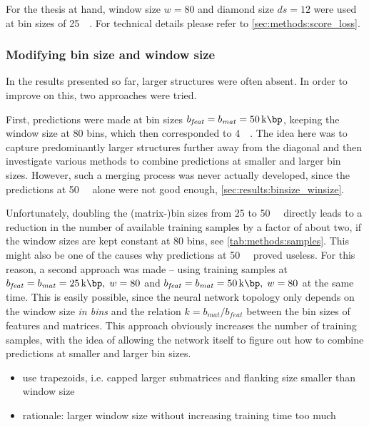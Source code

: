 For the thesis at hand, window size $w=80$ and diamond size $ds={12}$ were used at bin sizes of \SI{25}{\kilo\bp}.
For technical details please refer to \cref{sec:methods:score_loss}.

\subsubsection{Modifying bin size and window size}\label{sec:improve:binsize_winsize}
In the results presented so far, larger structures were often absent.
In order to improve on this, two approaches were tried.

First, predictions were made at bin sizes $b_\mathit{feat} = b_\mathit{mat} = \SI{50}{\kilo\bp}$, 
keeping the window size at 80 bins, which then corresponded to \SI{4}{\mega\bp}.
The idea here was to capture predominantly larger structures further away from the diagonal and
then investigate various methods to combine predictions at smaller and larger bin sizes.
However, such a merging process was never actually developed,
since the predictions at \SI{50}{\kilo\bp} alone were not good enough, \cref{sec:results:binsize_winsize}.

Unfortunately, doubling the (matrix-)bin sizes from 25 to \SI{50}{\kilo\bp} directly leads to a reduction in the number of available training samples by a factor of about two, 
if the window sizes are kept constant at 80 bins, see \cref{tab:methods:samples}. 
This might also be one of the causes why predictions at \SI{50}{\kilo\bp} proved useless.
For this reason, a second approach was made -- using training samples at $b_\mathit{feat} = b_\mathit{mat} = \SI{25}{\kilo\bp},\;w=80$
and $b_\mathit{feat} = b_\mathit{mat} = \SI{50}{\kilo\bp},\;w=80$ at the same time.
This is easily possible, since the neural network topology only depends on the window size \emph{in bins} and the relation $k=b_\mathit{mat}/b_\mathit{feat}$
between the bin sizes of features and matrices.
This approach obviously increases the number of training samples,
with the idea of allowing the network itself to figure out how to combine predictions at smaller and larger bin sizes.


\begin{itemize}
 \item use trapezoids, i.e. capped larger submatrices and flanking size smaller than window size
 \item rationale: larger window size without increasing training time too much
 \end{itemize}
 
